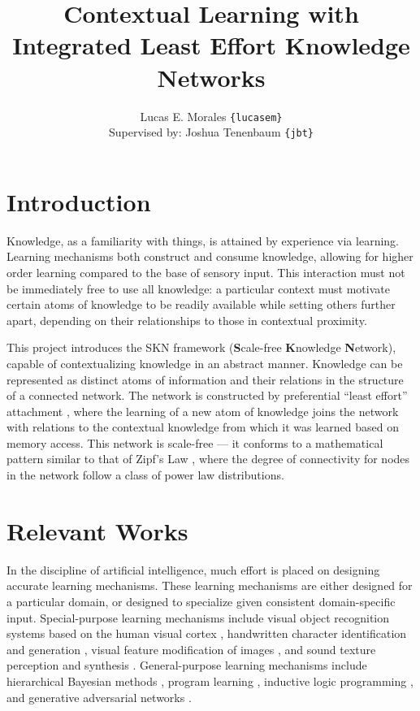 \documentclass[11pt,letterpaper]{article}
\title{{\Large Contextual Learning with Integrated Least Effort Knowledge Networks}}
\author{Lucas E. Morales \texttt{\{lucasem\}}\\
Supervised by: Joshua Tenenbaum \texttt{\{jbt\}}}
\date{}
\begin{document}
\maketitle

\section{Introduction}

Knowledge, as a familiarity with things, is attained by experience via
learning. Learning mechanisms both construct and consume knowledge, allowing
for higher order learning compared to the base of sensory input. This
interaction must not be immediately free to use all knowledge: a particular
context must motivate certain atoms of knowledge to be readily available
while setting others further apart, depending on their relationships to
those in contextual proximity.

This project introduces the SKN framework ({\bf S}cale-free {\bf K}nowledge
{\bf N}etwork), capable of contextualizing knowledge in an abstract manner.
Knowledge can be represented as distinct atoms of information and their
relations in the structure of a connected network. The network is
constructed by preferential ``least effort'' attachment
\cite{barabasi99}\cite{cancho03}, where the learning of a new atom of
knowledge joins the network with relations to the contextual knowledge from
which it was learned based on memory access. This network is scale-free ---
it conforms to a mathematical pattern similar to that of Zipf's Law
\cite{zipf49}, where the degree of connectivity for nodes in the network
follow a class of power law distributions.


\section{Relevant Works}

In the discipline of artificial intelligence, much effort is placed on
designing accurate learning mechanisms. These learning mechanisms are
either designed for a particular domain, or designed to specialize
given consistent domain-specific input. Special-purpose learning mechanisms
include visual object recognition systems based on the human visual cortex
\cite{serre07}, handwritten character identification and generation
\cite{lake15}, visual feature modification of images \cite{kulkarni15}, and
sound texture perception and synthesis \cite{mcdermott11}. General-purpose
learning mechanisms include hierarchical Bayesian methods
\cite{tenenbaum01}, program learning \cite{liang10}\cite{dechter13},
inductive logic programming \cite{lavrac94}\cite{muggleton15}, and
generative adversarial networks \cite{goodfellow14}.
\end{document}
